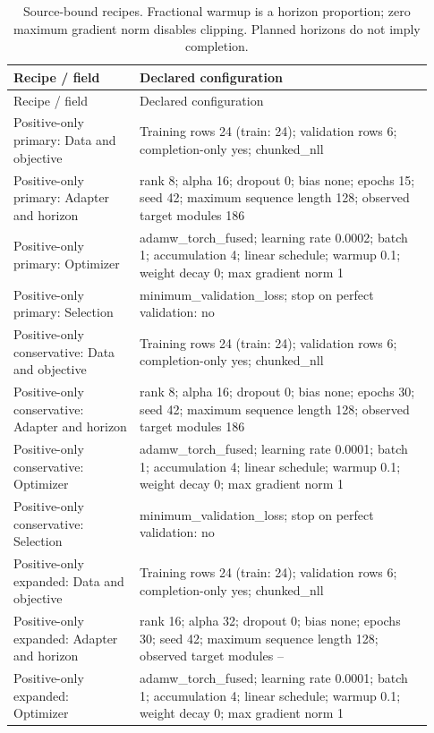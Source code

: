 \begingroup\small
\begin{longtable}{p{0.28\linewidth}p{0.65\linewidth}}
\caption{Source-bound recipes. Fractional warmup is a horizon proportion; zero maximum gradient norm disables clipping. Planned horizons do not imply completion.}\label{tab:generated-recipes}\\
\toprule
Recipe / field & Declared configuration \\
\midrule\endfirsthead
\toprule
Recipe / field & Declared configuration \\
\midrule\endhead
Positive-only primary: Data and objective & Training rows 24 (train: 24); validation rows 6; completion-only yes; chunked\_nll \\
Positive-only primary: Adapter and horizon & rank 8; alpha 16; dropout 0; bias none; epochs 15; seed 42; maximum sequence length 128; observed target modules 186 \\
Positive-only primary: Optimizer & adamw\_torch\_fused; learning rate 0.0002; batch 1; accumulation 4; linear schedule; warmup 0.1; weight decay 0; max gradient norm 1 \\
Positive-only primary: Selection & minimum\_validation\_loss; stop on perfect validation: no \\
Positive-only conservative: Data and objective & Training rows 24 (train: 24); validation rows 6; completion-only yes; chunked\_nll \\
Positive-only conservative: Adapter and horizon & rank 8; alpha 16; dropout 0; bias none; epochs 30; seed 42; maximum sequence length 128; observed target modules 186 \\
Positive-only conservative: Optimizer & adamw\_torch\_fused; learning rate 0.0001; batch 1; accumulation 4; linear schedule; warmup 0.1; weight decay 0; max gradient norm 1 \\
Positive-only conservative: Selection & minimum\_validation\_loss; stop on perfect validation: no \\
Positive-only expanded: Data and objective & Training rows 24 (train: 24); validation rows 6; completion-only yes; chunked\_nll \\
Positive-only expanded: Adapter and horizon & rank 16; alpha 32; dropout 0; bias none; epochs 30; seed 42; maximum sequence length 128; observed target modules -- \\
Positive-only expanded: Optimizer & adamw\_torch\_fused; learning rate 0.0001; batch 1; accumulation 4; linear schedule; warmup 0.1; weight decay 0; max gradient norm 1 \\

\end{longtable}
